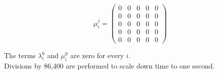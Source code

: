 $$
  \mu_i^j =
  \begin{pmatrix}
   0 & 0 & 0 & 0 & 0 \\
   0 & 0 & 0 & 0 & 0 \\
   0 & 0 & 0 & 0 & 0 \\
   0 & 0 & 0 & 0 & 0 \\
   0 & 0 & 0 & 0 & 0
  \end{pmatrix}
$$

The terms $\lambda_i^0$ and $\mu_i^0$ are zero for every $i$.\\

Divisions by 86,400 are performed to scale down time to one second.
